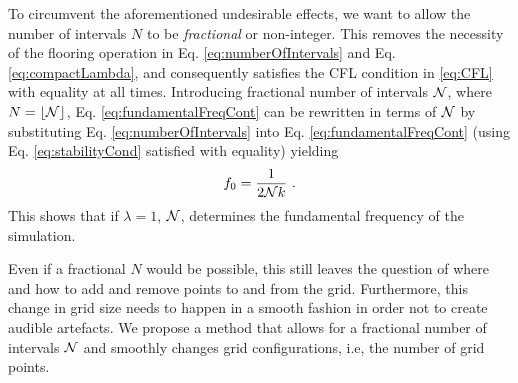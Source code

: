 To circumvent the aforementioned undesirable effects, we want to allow the number of intervals $N$ to be \textit{fractional} or non-integer. This removes the necessity of the flooring operation in Eq. \eqref{eq:numberOfIntervals} and Eq. \eqref{eq:compactLambda}, and consequently satisfies the CFL condition in \eqref{eq:CFL} with equality at all times. Introducing fractional number of intervals $\mathcal{N}$, where $N = \lfloor \mathcal{N}\rfloor$, Eq. \eqref{eq:fundamentalFreqCont} can be rewritten in terms of $\mathcal{N}$ by substituting Eq. \eqref{eq:numberOfIntervals} into Eq. \eqref{eq:fundamentalFreqCont} (using Eq. \eqref{eq:stabilityCond} satisfied with equality) yielding
\begin{equation}\label{eq:fundamentalFreq}
    f_0 = \frac{1}{2\mathcal{N} k}\ .
\end{equation}
This shows that if $\lambda = 1$, $\mathcal{N}$,  determines the fundamental frequency of the simulation. 

Even if a fractional $N$ would be possible, this still leaves the question of where and how to add and remove points to and from the grid. Furthermore, this change in grid size needs to happen in a smooth fashion in order not to create audible artefacts. 
We propose a method that allows for a fractional number of intervals $\mathcal{N}$ and smoothly changes grid configurations, i.e, the number of grid points. %



